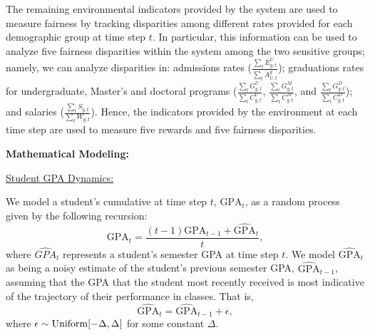 The remaining environmental indicators provided by the system are used to measure fairness by tracking disparities among different rates provided for each demographic group at time step $t$. In particular, this information can be used to analyze five fairness disparities within the system among the two sensitive groups; namely, we can analyze disparities in: admissions rates ($\frac{\sum_t E_{g,t}^{U}}{\sum_t A_{U,t}^{g}}$); graduations rates for undergraduate, Master's and doctoral programs ($\frac{\sum_t G_{g,t}^{U}}{\sum_t C_{g,t}^{U}}$, $\frac{\sum_t G_{g,t}^{M}}{\sum_t C_{g,t}^{M}}$, and $\frac{\sum_t G_{g,t}^{D}}{\sum_t C_{g,t}^{D}}$); and salaries ($\frac{\sum_t S_{g,t}}{\sum_t W_{g, t}}$). Hence, the indicators provided by the environment at each time step are used to measure five rewards and five fairness disparities.

\textbf{Mathematical Modeling:} 
    
\underline{Student GPA Dynamics:}

We model a student's cumulative at time step $t$, $\text{GPA}_t$, as a random process given by the following recursion:
\begin{equation}
    \label{eq:GPA}
    \text{GPA}_t = \frac{(t-1)\text{GPA}_{t-1} + \widehat{\text{GPA}}_{t}}{t},
\end{equation}
where $\widehat{GPA}_{t}$ represents a student's semester GPA at time step $t$. We model $\widehat{\text{GPA}}_{t}$ as being a noisy estimate of the student's previous semester GPA, $\widehat{\text{GPA}}_{t-1}$, assuming that the GPA that the student most recently received is most indicative of the trajectory of their performance in classes. That is,
\begin{equation}
    \widehat{\text{GPA}}_{t} = \widehat{\text{GPA}}_{t-1}+ \epsilon,
\end{equation}
where $\epsilon\sim {\rm Uniform}[-\Delta,\Delta]$ for some constant $\Delta$.

